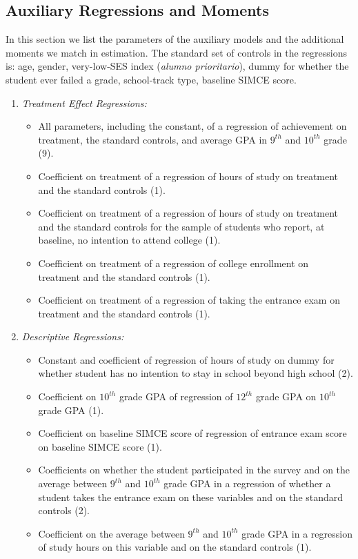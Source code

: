 \subsection{Auxiliary Regressions and Moments}\label{sec:appendix_moments}
In this section we list the parameters of the auxiliary models and the additional moments we match in estimation. The standard set of controls in the regressions is: age, gender, very-low-SES index ({\itshape alumno prioritario}), dummy for whether the student ever failed a grade, school-track type, baseline SIMCE score.
\begin{enumerate}[leftmargin=5.5mm]
    \item {\itshape Treatment Effect Regressions:}
    
    \begin{itemize}[leftmargin=3.5mm] \setlength\itemsep{0.0em}
        \item All parameters, including the constant, of a regression of achievement on treatment, the standard controls, and average GPA in $9^{th}$ and $10^{th}$ grade (9).
        \item Coefficient on treatment of a regression of hours of study on treatment and the standard controls (1).
        \item Coefficient on treatment of a regression of hours of study on treatment and the standard controls for the sample of students who report, at baseline, no intention to attend college (1).
        \item Coefficient on treatment of a regression of college enrollment on treatment and the standard controls (1).
        \item Coefficient on treatment of a regression of taking the entrance exam on treatment and the standard controls (1).
    \end{itemize}
    
    
    \item {\itshape Descriptive Regressions:}
    \begin{itemize}[leftmargin=3.5mm]\setlength\itemsep{0.0em}
     \item Constant and coefficient of regression of hours of study on dummy for whether student has no intention to stay in school beyond high school (2).
     \item Coefficient on $10^{th}$ grade GPA of regression of $12^{th}$ grade GPA on $10^{th}$ grade GPA (1).
     \item Coefficient on baseline SIMCE score of regression of entrance exam score on baseline SIMCE score (1).
     \item Coefficients on whether the student participated in the survey and on the average between $9^{th}$ and $10^{th}$ grade GPA in a regression of whether a student takes the entrance exam on these variables and on the standard controls (2).
     \item Coefficient on the average between $9^{th}$ and $10^{th}$ grade GPA in a regression of study hours on this variable and on the standard controls (1).
    \end{itemize}
    

\end{enumerate}
